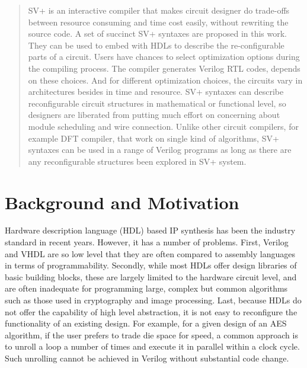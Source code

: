 \documentclass{acm_proc_article-sp}
\begin{document}
\begin{abstract}
SV+ is an interactive compiler that makes circuit designer do trade-offs 
between resource consuming and time cost easily, without rewriting the 
source code. A set of succinct SV+ syntaxes are proposed in this work. 
They can be used to embed with HDLs\cite{intro:HDL} to describe the 
re-configurable parts of a circuit. Users have chances to select 
optimization options during the compiling process. The compiler 
generates Verilog RTL codes, depends on these choices. And for different
optimization choices, the circuits vary in architectures besides 
in time and resource. SV+ syntaxes can describe reconfigurable circuit
structures in mathematical or functional level, so designers are 
liberated from putting much effort on concerning about module scheduling
and wire connection. Unlike other circuit compilers, for example DFT 
compiler\cite{GNordin:FFT}, that work on single kind of algorithms,
SV+ syntaxes can be used in a range of Verilog programs as long as 
there are any reconfigurable structures been explored in SV+ system.
\end{abstract}
\section{Background and Motivation}
Hardware description language (HDL)\cite{intro:HDL} based IP synthesis has been the 
industry standard in recent years.
However, it has a number of problems.
First, Verilog and VHDL are so low level that they are often compared to assembly languages
in terms of programmability.
Secondly, while most HDLs offer design libraries of basic building blocks,
these are largely limited to the hardware circuit level, and are often inadequate for programming
large, complex but common algorithms such as those used in cryptography and image processing.
Last, because HDLs do not offer the 
capability of high level abstraction, it is not easy to reconfigure the functionality of an
existing design. For example, for a given design of an AES\cite{AES} algorithm, if the user prefers
to trade die space for speed, a common approach is to unroll a loop a number of times
and execute it in parallel within a clock cycle. Such unrolling cannot be achieved
in Verilog without substantial code change.
\end{document}
